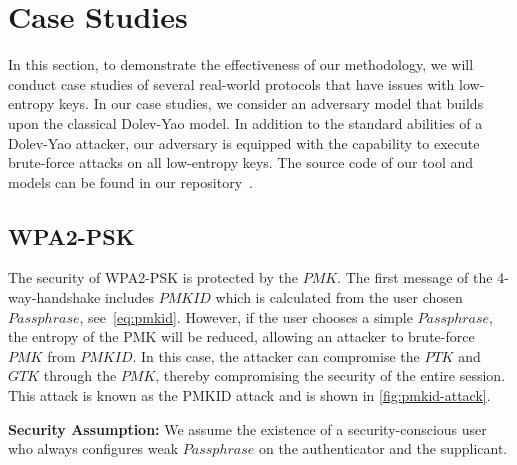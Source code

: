 \documentclass[../main.tex]{subfiles}  %
\begin{document}
\section{ Case Studies } \label{sec:5case-study}

In this section, to demonstrate the effectiveness of our methodology, we will conduct case studies of several real-world protocols that have issues with low-entropy keys. 
In our case studies, we consider an adversary model that builds upon the classical Dolev-Yao model. 
In addition to the standard abilities of a Dolev-Yao attacker, our adversary is equipped with the capability to execute brute-force attacks on all low-entropy keys.
The source code of our tool and models can be found in our repository~\cite{toolrepo}.

\subsection{WPA2-PSK} \label{sec:wpa2-psk}

The security of WPA2-PSK is protected by the $PMK$. 
The first message of the 4-way-handshake includes $PMKID$ which is calculated from the user chosen $Passphrase$, see~\autoref{eq:pmkid}. 
However, if the user chooses a simple $Passphrase$, the entropy of the PMK will be reduced, allowing an attacker to brute-force $PMK$ from $PMKID$. 
In this case, the attacker can compromise the $PTK$ and $GTK$ through the $PMK$, thereby compromising the security of the entire session. 
This attack is known as the PMKID attack\cite{pmkidattack} and is shown in \autoref{fig:pmkid-attack}. 


\noindent
\textbf{Security Assumption:} 
We assume the existence of a security-conscious user who always configures weak $Passphrase$ on the authenticator and the supplicant.
\end{document}
